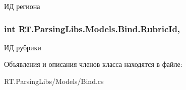 ИД региона 

\hypertarget{class_r_t_1_1_parsing_libs_1_1_models_1_1_bind_a851d2f77b35865675caad8c99d6f4056}{
\subsubsection[{Rubric\+Id}]{\setlength{\rightskip}{0pt plus 5cm}int R\+T.\+Parsing\+Libs.\+Models.\+Bind.\+Rubric\+Id\hspace{0.3cm}{\ttfamily [get]}, {\ttfamily [set]}}}\label{class_r_t_1_1_parsing_libs_1_1_models_1_1_bind_a851d2f77b35865675caad8c99d6f4056}


ИД рубрики 



Объявления и описания членов класса находятся в файле\+:\begin{DoxyCompactItemize}
\item 
R\+T.\+Parsing\+Libs/\+Models/Bind.\+cs\end{DoxyCompactItemize}
